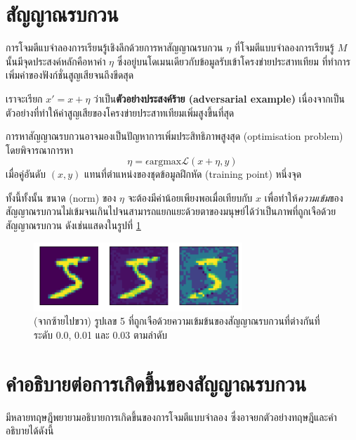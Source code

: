 \section{สัญญาณรบกวน}

การโจมตีแบจำลองการเรียนรู้เชิงลึกด้วยการหาสัญญาณรบกวน $\eta$ ที่โจมตีแบบจำลองการเรียนรู้ $M$ นั้นมีจุดประสงค์หลักคือหาค่า $\eta$ ซึ่งอยู่บนโดเมนเดียวกับข้อมูลรับเข้าโครงข่ายประสาทเทียม ที่ทำการเพิ่มค่าของฟังก์ชั่นสูญเสียจนถึงขีดสุด

เราจะเรียก $x' = x+\eta$ ว่าเป็น\textbf{ตัวอย่างประสงค์ร้าย (adversarial example)} เนื่องจากเป็นตัวอย่างที่ทำให้ค่าสูญเสียของโครงข่ายประสาทเทียมเพิ่มสูงขึ้นที่สุด

การหาสัญญาณรบกวนอาจมองเป็นปัญหาการเพิ่มประสิทธิภาพสูงสุด (optimisation problem) โดยพิจารณาการหา
\begin{equation}
    \eta = \epsilon \mathrm{argmax}\mathscr{L}\left(x+\eta, y\right)
    \label{perturbation}
\end{equation}
เมื่อคู่อันดับ $(x,y)$ แทนที่ตำแหน่งของชุดข้อมูลฝึกหัด (training point) หนึ่งจุด

ทั้งนี้ทั้งนั้น ขนาด (norm) ของ $\eta$ จะต้องมีค่าน้อยเพียงพอเมื่อเทียบกับ $x$ เพื่อทำให้\textit{ความเข้ม}ของสัญญาณรบกวนไม่เข้มจนเกินไปจนสามารถแยกแยะด้วยตาของมนุษย์ได้ว่าเป็นภาพที่ถูกเจือด้วยสัญญาณรบกวน ดังเช่นแสดงในรูปที่ \ref{perturbation-density}

\begin{figure}
    \centering
    \includegraphics[width=0.7\textwidth]{images/density.pdf}
    \caption{(จากซ้ายไปขวา) รูปเลข 5 ที่ถูกเจือด้วยความเข้มข้นของสัญญาณรบกวนที่ต่างกันที่ระดับ 0.0,  0.01 และ 0.03 ตามลำดับ}
    \label{perturbation-density}
\end{figure}

\section{คำอธิบายต่อการเกิดขึ้นของสัญญาณรบกวน}

มีหลายทฤษฎีพยายามอธิบายการเกิดขึ้นของการโจมตีแบบจำลอง ซึ่งอาจยกตัวอย่างทฤษฎีและคำอธิบายได้ดังนี้

